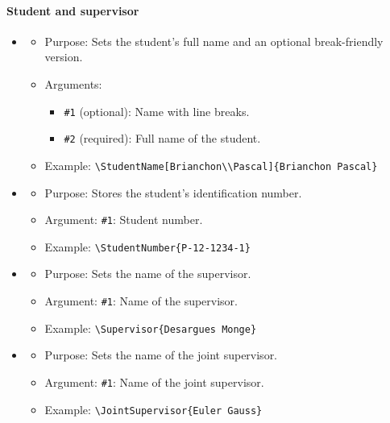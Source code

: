 \paragraph{Student and supervisor}
\begin{itemize}[noitemsep]
\item {}
\begin{itemize}[noitemsep]
  \item \textsf{Purpose:} Sets the student's full name and an optional break-friendly version.
  \item \textsf{Arguments:}
    \begin{itemize}[noitemsep]
      \item \texttt{\#1} (optional): Name with line breaks.
      \item \texttt{\#2} (required): Full name of the student.
    \end{itemize}
  \item \textsf{Example:} \verb|\StudentName[Brianchon\\Pascal]{Brianchon Pascal}|
\end{itemize}

\item {}
\begin{itemize}[noitemsep]
  \item \textsf{Purpose:} Stores the student’s identification number.
  \item \textsf{Argument:} \texttt{\#1}: Student number.
  \item \textsf{Example:} \verb|\StudentNumber{P-12-1234-1}|
\end{itemize}

\item {}
\begin{itemize}[noitemsep]
  \item \textsf{Purpose:} Sets the name of the supervisor.
  \item \textsf{Argument:} \texttt{\#1}: Name of the supervisor.
  \item \textsf{Example:} \verb|\Supervisor{Desargues Monge}|
\end{itemize}

\item {}
\begin{itemize}[noitemsep]
  \item \textsf{Purpose:} Sets the name of the joint supervisor.
  \item \textsf{Argument:} \texttt{\#1}: Name of the joint supervisor.
  \item \textsf{Example:} \verb|\JointSupervisor{Euler Gauss}|
\end{itemize}


\end{itemize}
